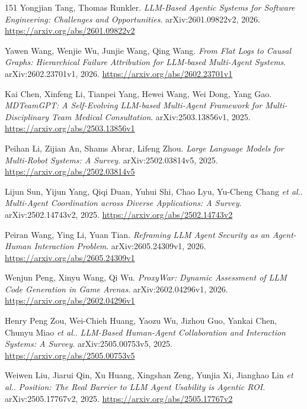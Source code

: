 \documentclass[11pt,a4paper]{article}
\begin{document}
\begin{thebibliography}{151}
Yongjian Tang, Thomas Runkler.
\newblock \emph{LLM-Based Agentic Systems for Software Engineering: Challenges and Opportunities}.
\newblock arXiv:2601.09822v2, 2026.
\newblock \url{https://arxiv.org/abs/2601.09822v2}

Yawen Wang, Wenjie Wu, Junjie Wang, Qing Wang.
\newblock \emph{From Flat Logs to Causal Graphs: Hierarchical Failure Attribution for LLM-based Multi-Agent Systems}.
\newblock arXiv:2602.23701v1, 2026.
\newblock \url{https://arxiv.org/abs/2602.23701v1}

Kai Chen, Xinfeng Li, Tianpei Yang, Hewei Wang, Wei Dong, Yang Gao.
\newblock \emph{MDTeamGPT: A Self-Evolving LLM-based Multi-Agent Framework for Multi-Disciplinary Team Medical Consultation}.
\newblock arXiv:2503.13856v1, 2025.
\newblock \url{https://arxiv.org/abs/2503.13856v1}

Peihan Li, Zijian An, Shams Abrar, Lifeng Zhou.
\newblock \emph{Large Language Models for Multi-Robot Systems: A Survey}.
\newblock arXiv:2502.03814v5, 2025.
\newblock \url{https://arxiv.org/abs/2502.03814v5}

Lijun Sun, Yijun Yang, Qiqi Duan, Yuhui Shi, Chao Lyu, Yu-Cheng Chang \emph{et al.}.
\newblock \emph{Multi-Agent Coordination across Diverse Applications: A Survey}.
\newblock arXiv:2502.14743v2, 2025.
\newblock \url{https://arxiv.org/abs/2502.14743v2}

Peiran Wang, Ying Li, Yuan Tian.
\newblock \emph{Reframing LLM Agent Security as an Agent-Human Interaction Problem}.
\newblock arXiv:2605.24309v1, 2026.
\newblock \url{https://arxiv.org/abs/2605.24309v1}

Wenjun Peng, Xinyu Wang, Qi Wu.
\newblock \emph{ProxyWar: Dynamic Assessment of LLM Code Generation in Game Arenas}.
\newblock arXiv:2602.04296v1, 2026.
\newblock \url{https://arxiv.org/abs/2602.04296v1}

Henry Peng Zou, Wei-Chieh Huang, Yaozu Wu, Jizhou Guo, Yankai Chen, Chunyu Miao \emph{et al.}.
\newblock \emph{LLM-Based Human-Agent Collaboration and Interaction Systems: A Survey}.
\newblock arXiv:2505.00753v5, 2025.
\newblock \url{https://arxiv.org/abs/2505.00753v5}

Weiwen Liu, Jiarui Qin, Xu Huang, Xingshan Zeng, Yunjia Xi, Jianghao Lin \emph{et al.}.
\newblock \emph{Position: The Real Barrier to LLM Agent Usability is Agentic ROI}.
\newblock arXiv:2505.17767v2, 2025.
\newblock \url{https://arxiv.org/abs/2505.17767v2}


\end{thebibliography}
\end{document}
